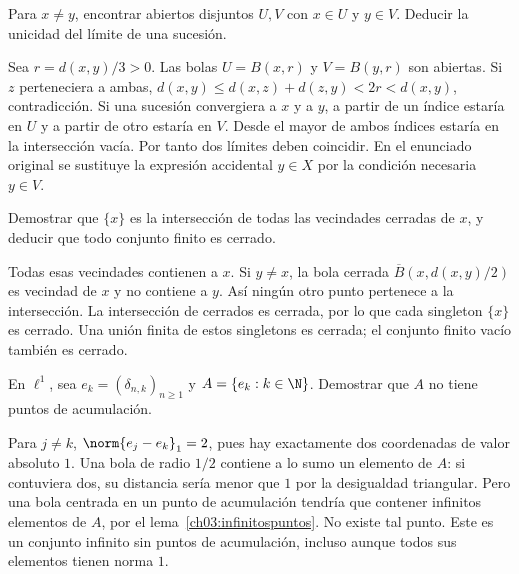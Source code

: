 \begin{ejercicio}
Para $x\ne y$, encontrar abiertos disjuntos $U,V$ con $x\in U$ y $y\in V$. Deducir la unicidad del límite de una sucesión.
\end{ejercicio}
\begin{solucion}
Sea $r=d(x,y)/3>0$. Las bolas $U=B(x,r)$ y $V=B(y,r)$ son abiertas. Si $z$ perteneciera a ambas, $d(x,y)\le d(x,z)+d(z,y)<2r<d(x,y)$, contradicción. Si una sucesión convergiera a $x$ y a $y$, a partir de un índice estaría en $U$ y a partir de otro estaría en $V$. Desde el mayor de ambos índices estaría en la intersección vacía. Por tanto dos límites deben coincidir. En el enunciado original se sustituye la expresión accidental $y\in X$ por la condición necesaria $y\in V$.
\end{solucion}

\begin{ejercicio}
Demostrar que $\{x\}$ es la intersección de todas las vecindades cerradas de $x$, y deducir que todo conjunto finito es cerrado.
\end{ejercicio}
\begin{solucion}
Todas esas vecindades contienen a $x$. Si $y\ne x$, la bola cerrada $\overline B(x,d(x,y)/2)$ es vecindad de $x$ y no contiene a $y$. Así ningún otro punto pertenece a la intersección. La intersección de cerrados es cerrada, por lo que cada singleton $\{x\}$ es cerrado. Una unión finita de estos singletons es cerrada; el conjunto finito vacío también es cerrado.
\end{solucion}

\begin{ejercicio}
En $\ell^1$, sea $e_k=(\delta_{n,k})_{n\ge1}$ y $A=\{e_k:k\in\N\}$. Demostrar que $A$ no tiene puntos de acumulación.
\end{ejercicio}
\begin{solucion}
Para $j\ne k$, $\norm{e_j-e_k}_1=2$, pues hay exactamente dos coordenadas de valor absoluto $1$. Una bola de radio $1/2$ contiene a lo sumo un elemento de $A$: si contuviera dos, su distancia sería menor que $1$ por la desigualdad triangular. Pero una bola centrada en un punto de acumulación tendría que contener infinitos elementos de $A$, por el lema~\ref{ch03:infinitospuntos}. No existe tal punto. Este es un conjunto infinito sin puntos de acumulación, incluso aunque todos sus elementos tienen norma $1$.
\end{solucion}

